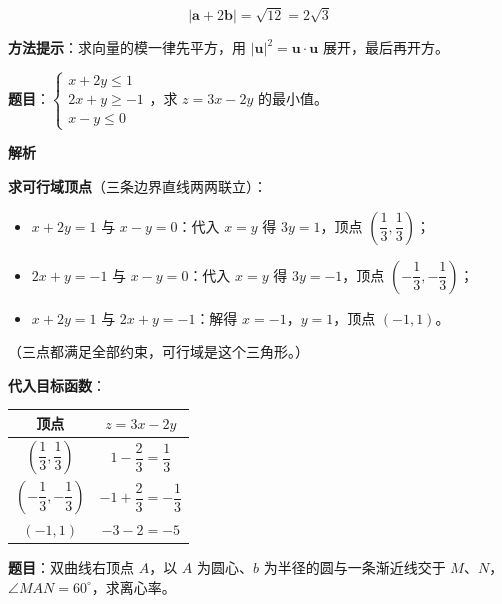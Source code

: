 \[|\boldsymbol a+2\boldsymbol b|=\sqrt{12}=2\sqrt3\]


\begin{gktip}
\textbf{方法提示}：求向量的模一律先平方，用 $|\boldsymbol u|^{2}=\boldsymbol u\cdot\boldsymbol u$ 展开，最后再开方。
\end{gktip}

\par\medskip


\textbf{题目}：$\begin{cases}x+2y\le1\\ 2x+y\ge-1\\ x-y\le0\end{cases}$，求 $z=3x-2y$ 的最小值。

\textbf{解析}

\textbf{求可行域顶点}（三条边界直线两两联立）：

\begin{itemize}
\item $x+2y=1$ 与 $x-y=0$：代入 $x=y$ 得 $3y=1$，顶点 $\left(\dfrac13,\dfrac13\right)$；
\item $2x+y=-1$ 与 $x-y=0$：代入 $x=y$ 得 $3y=-1$，顶点 $\left(-\dfrac13,-\dfrac13\right)$；
\item $x+2y=1$ 与 $2x+y=-1$：解得 $x=-1$，$y=1$，顶点 $(-1,1)$。
\end{itemize}

（三点都满足全部约束，可行域是这个三角形。）

\textbf{代入目标函数}：

\begin{center}
\begin{tabular}{cc}
\toprule
顶点 & $z=3x-2y$ \\
\midrule
$\left(\dfrac13,\dfrac13\right)$ & $1-\dfrac23=\dfrac13$ \\
$\left(-\dfrac13,-\dfrac13\right)$ & $-1+\dfrac23=-\dfrac13$ \\
$(-1,1)$ & $-3-2=\boxed{-5}$ \\
\bottomrule
\end{tabular}
\end{center}


\par\medskip


\textbf{题目}：双曲线右顶点 $A$，以 $A$ 为圆心、$b$ 为半径的圆与一条渐近线交于 $M$、$N$，$\angle MAN=60^\circ$，求离心率。

